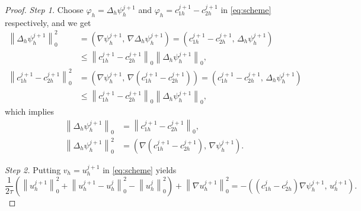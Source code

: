 \begin{proof}
\textit{Step 1.}
Choose $\varphi_{h} = \Delta_{h}\psi_{h}^{j+1}$ and
$\varphi_{h} = c_{1h}^{j+1} - c_{2h}^{j+1}$ in \eqref{eq:scheme} respectively, and we get
\begin{align}
  \left\|\Delta_{h}\psi_{h}^{j+1}\right\|_{0}^{2}
  &= \left(\nabla\psi_{h}^{j+1},\, \nabla\Delta_{h}\psi_{h}^{j+1}\right)
   = \left(c_{1h}^{j+1} - c_{2h}^{j+1},\, \Delta_{h}\psi_{h}^{j+1}\right)
   \nonumber\\
  &\leq
   \left\|c_{1h}^{j+1} - c_{2h}^{j+1}\right\|_{0}
   \left\|\Delta_{h}\psi_{h}^{j+1}\right\|_{0},
   \label{eq:step1a}\\[4pt]
  \left\|c_{1h}^{j+1} - c_{2h}^{j+1}\right\|_{0}^{2}
  &= \left(\nabla\psi_{h}^{j+1},\, \nabla(c_{1h}^{j+1} - c_{2h}^{j+1})\right)
   = \left(c_{1h}^{j+1} - c_{2h}^{j+1},\, \Delta_{h}\psi_{h}^{j+1}\right)
   \nonumber\\
  &\leq
   \left\|c_{1h}^{j+1} - c_{2h}^{j+1}\right\|_{0}
   \left\|\Delta_{h}\psi_{h}^{j+1}\right\|_{0},
   \label{eq:step1b}
\end{align}
which implies
\begin{align}
  \left\|\Delta_{h}\psi_{h}^{j+1}\right\|_{0}
  &= \left\|c_{1h}^{j+1} - c_{2h}^{j+1}\right\|_{0},
  \label{eq:Deltapsi-eq}\\
  \left\|\Delta_{h}\psi_{h}^{j+1}\right\|_{0}^{2}
  &= \left(\nabla(c_{1h}^{j+1} - c_{2h}^{j+1}),\,\nabla\psi_{h}^{j+1}\right).
  \label{eq:Deltapsi-sq}
\end{align}

\textit{Step 2.}
Putting $v_{h} = u_{h}^{j+1}$ in \eqref{eq:scheme} yields
\begin{equation}
  \frac{1}{2\tau}\!\left(
    \left\|u_{h}^{j+1}\right\|_{0}^{2}
    + \left\|u_{h}^{j+1} - u_{h}^{j}\right\|_{0}^{2}
    - \left\|u_{h}^{j}\right\|_{0}^{2}
  \right)
  + \left\|\nabla u_{h}^{j+1}\right\|_{0}^{2}
  = -\!\left((c_{1h}^{j} - c_{2h}^{j})\nabla\psi_{h}^{j+1},\, u_{h}^{j+1}\right).
  \label{eq:step2-u}
\end{equation}


\end{proof}
